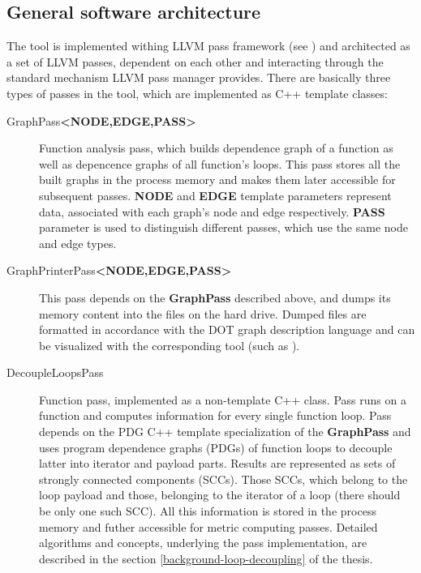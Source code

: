\subsection{General software architecture} \label{ppar-tool-general-software-architecture}
\qquad The tool is implemented withing LLVM pass framework (see \cite{llvm-online-docs-pass-framework}) and architected as a set of LLVM passes, dependent on each other and interacting through the standard mechanism LLVM pass manager provides. There are basically three types of passes in the tool, which are implemented as C++ template classes:
\begin{description}
	
	\item [GraphPass\textbf{\textless NODE,EDGE,PASS\textgreater}] Function analysis pass, which builds dependence graph of a function as well as depencence graphs of all function's loops. This pass stores all the built graphs in the process memory and makes them later accessible for subsequent passes. \textbf{NODE} and \textbf{EDGE} template parameters represent data, associated with each graph's node and edge respectively. \textbf{PASS} parameter is used to distinguish different passes, which use the same node and edge types. 

	\item [GraphPrinterPass\textbf{\textless NODE,EDGE,PASS\textgreater}] This pass depends on the \textbf{GraphPass} described above, and dumps its memory content into the files on the hard drive. Dumped files are formatted in accordance with the DOT graph description language and can be visualized with the corresponding tool (such as \cite{graphviz-official-website}).    

	\item [DecoupleLoopsPass] Function pass, implemented as a non-template C++ class. Pass runs on a function and computes information for every single function loop. Pass depends on the PDG C++ template specialization of the \textbf{GraphPass} and uses program dependence graphs (PDGs) of function loops to decouple latter into iterator and payload parts. Results are represented as sets of strongly connected components (SCCs). Those SCCs, which belong to the loop payload and those, belonging to the iterator of a loop (there should be only one such SCC). All this information is stored in the process memory and futher accessible for metric computing passes. Detailed algorithms and concepts, underlying the pass implementation, are described in the section \ref{background-loop-decoupling} of the thesis.  


\end{description}
